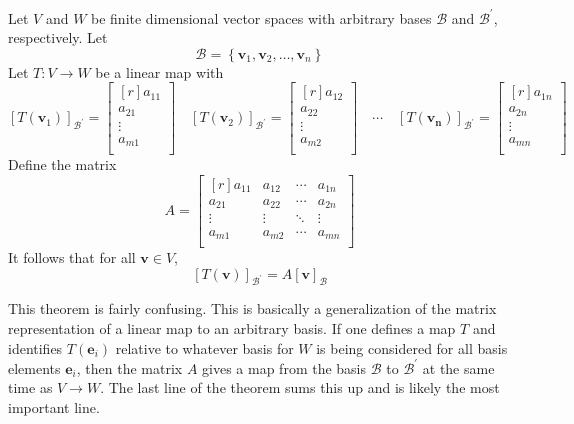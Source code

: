 \begin{theorem}\label{thismakessense}
    Let \(V\) and \(W\) be finite dimensional vector spaces with arbitrary bases \(\mathcal{B} \) and \(\mathcal{B} ^{\prime} \), respectively. Let 
    \[
        \mathcal{B} = \left\{ \mathbf{v}_1,\mathbf{v}_2,\ldots,\mathbf{v}_n \right\} 
    \]
    Let \(T:V\to W\) be a linear map with 
    \[
        [T(\mathbf{v}_1)]_{\mathcal{B} ^{\prime} }=\begin{bmatrix}[r]
             a_{11}  \\
              a_{21} \\
              \vdots\\
              a_{m1} \\
        \end{bmatrix}\quad [T(\mathbf{v}_2)]_{\mathcal{B} ^{\prime} }=\begin{bmatrix}[r]
            a_{12}  \\
             a_{22} \\
             \vdots\\
             a_{m2} \\
       \end{bmatrix}\quad \cdots \quad [T(\mathbf{v_n})]_{\mathcal{B} ^{\prime} }=\begin{bmatrix}[r]
        a_{1n}  \\
         a_{2n} \\
         \vdots\\
         a_{mn} \\
   \end{bmatrix}
    \]
    Define the matrix
    \[
        A=\begin{bmatrix}[r]
            a_{11}  &a_{12}   &\cdots  &a_{1n}    \\
             a_{21} &a_{22}   &\cdots  &a_{2n}    \\
             \vdots&\vdots  &\ddots  &\vdots   \\
             a_{m1} &a_{m2}   &\cdots &a_{mn}    \\
        \end{bmatrix}
    \]
    It follows that for all \(\mathbf{v}\in V\),
    \[
        [T(\mathbf{v})]_{\mathcal{B} ^{\prime} }=A[\mathbf{v}]_\mathcal{B} 
    \]
\end{theorem}
This theorem is fairly confusing. This is basically a generalization of the matrix representation of a linear map to an arbitrary basis. If one defines a map \(T\) and identifies \(T(\mathbf{e}_i)\) relative to whatever basis for \(W\) is being considered for all basis elements \(\mathbf{e}_i\), then the matrix \(A\) gives a map from the basis \(\mathcal{B} \) to \(\mathcal{B} ^{\prime} \) at the same time as \(V\to W\). The last line of the theorem sums this up and is likely the most important line.
